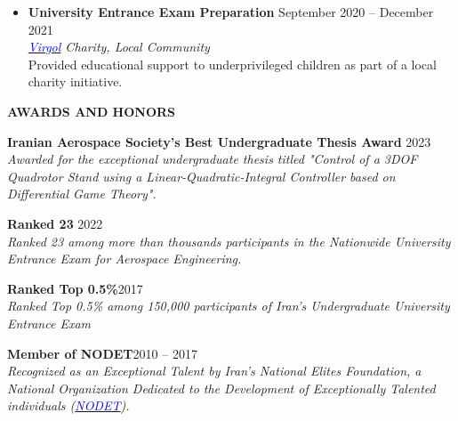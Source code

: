 \documentclass[12pt]{article}
\begin{document}
\begin{itemize}
	\item {\bfseries University Entrance Exam Preparation}
	\hfill September 2020 -- December 2021 \\
	\textit{\href{https://www.instagram.com/virgool_charity?igsh=MWxsOGF3cTk1dzY3dw==}{\textcolor{blue}{Virgol}} Charity, Local Community} \\
	Provided educational support to underprivileged children as part of a local charity initiative.
\end{itemize}


\vspace{0.2in} %


\begin{center}
	{\noindent \bfseries AWARDS AND HONORS}
\end{center}


\vspace{8pt} %


\noindent
{\bfseries Iranian Aerospace Society's Best Undergraduate Thesis Award}
\hfill 2023 \vspace{4pt} \\
\textit{Awarded for the exceptional
undergraduate thesis titled "Control of a 3DOF Quadrotor Stand using a Linear-Quadratic-Integral Controller
based on Differential Game Theory".}

\vspace{04pt}
\noindent
{\bfseries Ranked 23}
\hfill 2022 \vspace{4pt}\\
\textit{Ranked 23 among more than thousands participants in the Nationwide University Entrance Exam for Aerospace Engineering.}




\vspace{04pt}
\noindent
{\bfseries Ranked Top 0.5\%}\hfill 2017 \vspace{4pt} \\
\textit{Ranked Top 0.5\% among 150,000 participants of Iran's Undergraduate University Entrance Exam}

\vspace{04pt}
\noindent
{\bfseries Member of NODET}\hfill 2010 -- 2017 \vspace{4pt} \\
\textit{
	Recognized as an Exceptional Talent by Iran's National Elites Foundation, a National Organization Dedicated to the Development of Exceptionally Talented individuals (\textit{\href{https://en.wikipedia.org/wiki/National_Organization_for_Development_of_Exceptional_Talents}{\textcolor{blue}{NODET}}}).
}
\end{document}
